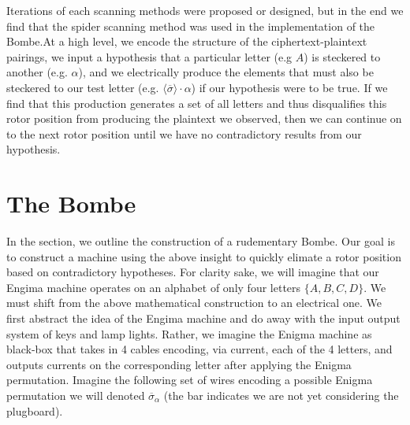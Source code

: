 Iterations of each scanning methods were proposed or designed, but in
the end we find that the spider scanning method was used in the
implementation of the Bombe.At a high level, we encode the structure
of the ciphertext-plaintext pairings, we input a hypothesis that a particular
letter (e.g $A$) is steckered to another (e.g. $\alpha$), and we
electrically produce the elements that must also be steckered to our test letter
(e.g. $\langle\overline{\sigma}\rangle\cdot\alpha$) if our hypothesis
were to be true. If we find that this production generates a set of
all letters and thus disqualifies this rotor position from producing
the plaintext we observed, then we can continue on to the next rotor
position until we have no contradictory results from our hypothesis.

\section{The Bombe}

In the section, we outline the construction of a rudementary Bombe.
Our goal is to construct a machine using the above insight to quickly
elimate a rotor position based on contradictory hypotheses. For
clarity sake, we will
imagine that our Engima machine operates on an alphabet of only four
letters $\{A, B, C, D\}$.
We must shift from the above mathematical construction to an
electrical one. We first abstract the idea of the Engima machine and
do away with the input output system of keys and lamp lights.
Rather, we imagine the Enigma machine as black-box that takes in 4
cables encoding, via current, each of the 4 letters, and outputs
currents on the corresponding letter after applying the Enigma permutation.
Imagine the following set of wires encoding a possible Enigma
permutation we will denoted $\overline\sigma_\alpha$ (the bar
indicates we are not yet considering the plugboard).


